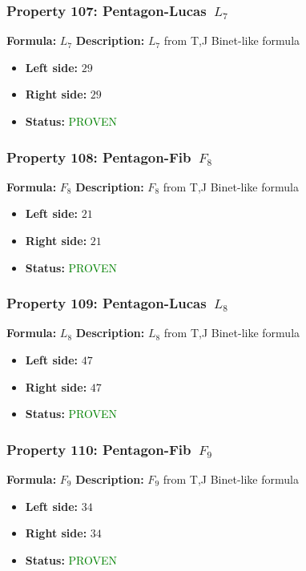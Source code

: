 \subsubsection*{Property 107: Pentagon-Lucas~$L_{7}$}
\textbf{Formula:} $L_7$
\textbf{Description:} $L_{7}$ from T,J Binet-like formula

\begin{itemize}
\item \textbf{Left side:} $29$
\item \textbf{Right side:} $29$
\item \textbf{Status:} \textcolor{green}{PROVEN}
\end{itemize}

\subsubsection*{Property 108: Pentagon-Fib~$F_{8}$}
\textbf{Formula:} $F_8$
\textbf{Description:} $F_{8}$ from T,J Binet-like formula

\begin{itemize}
\item \textbf{Left side:} $21$
\item \textbf{Right side:} $21$
\item \textbf{Status:} \textcolor{green}{PROVEN}
\end{itemize}

\subsubsection*{Property 109: Pentagon-Lucas~$L_{8}$}
\textbf{Formula:} $L_8$
\textbf{Description:} $L_{8}$ from T,J Binet-like formula

\begin{itemize}
\item \textbf{Left side:} $47$
\item \textbf{Right side:} $47$
\item \textbf{Status:} \textcolor{green}{PROVEN}
\end{itemize}

\subsubsection*{Property 110: Pentagon-Fib~$F_{9}$}
\textbf{Formula:} $F_9$
\textbf{Description:} $F_{9}$ from T,J Binet-like formula

\begin{itemize}
\item \textbf{Left side:} $34$
\item \textbf{Right side:} $34$
\item \textbf{Status:} \textcolor{green}{PROVEN}
\end{itemize}

